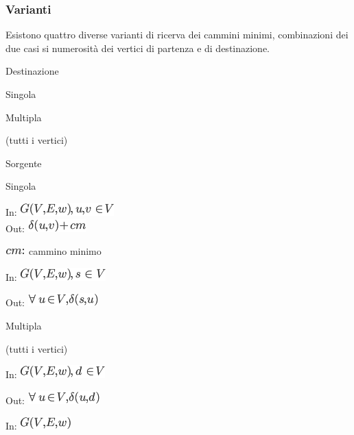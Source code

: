 \documentclass{article}
\begin{document}
{{{\subsubsection{\texorpdfstring{{Varianti}}{Varianti}}\label{h.39wfvuocrt5u}

{Esistono quattro diverse varianti di ricerva dei cammini minimi, combinazioni dei due casi si numerosità dei vertici di partenza e di destinazione.}

\protect\hypertarget{t.249d86aca9d964d15cac3725f6a7ace85a3425b4}{}{}\protect\hypertarget{t.45}{}{}

{Destinazione}

{Singola}

{Multipla}

{(tutti i vertici)}

{Sorgente}

{Singola}

{In: }\includegraphics{images/image498.png}{\\
Out: }\includegraphics{images/image499.png}

\includegraphics{images/image500.png}{~cammino minimo}

{In: }\includegraphics{images/image501.png}

{Out: }\includegraphics{images/image502.png}

{Multipla}

{(tutti i vertici)}

{In: }\includegraphics{images/image503.png}

{Out: }\includegraphics{images/image504.png}

{In: }\includegraphics{images/image505.png}

}}}
\end{document}

